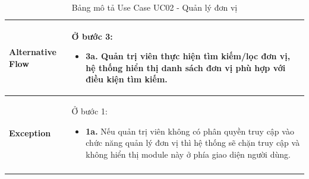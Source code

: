 \begin{longtable}{|m{}|m{}|}
\textbf{Alternative Flow} 
& Ở bước 3:
\begin{itemize}
    \item \textbf{3a.} Quản trị viên thực hiện tìm kiếm/lọc đơn vị, hệ thống hiển thị danh sách đơn vị phù hợp với điều kiện tìm kiếm.
\end{itemize}
\\ \hline

\textbf{Exception} 
& Ở bước 1:
\begin{itemize}
    \item \textbf{1a.} Nếu quản trị viên không có phân quyền truy cập vào chức năng quản lý đơn vị thì hệ thống sẽ chặn truy cập và không hiển thị module này ở phía giao diện người dùng.
\end{itemize}
\\ \hline
\caption{Bảng mô tả Use Case UC02 - Quản lý đơn vị}
\end{longtable}


